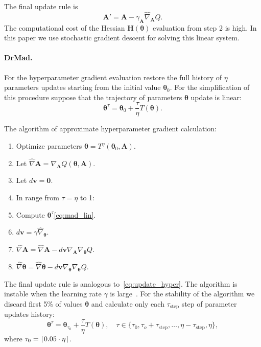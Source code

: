 \documentclass[12pt]{article}
\DeclarePairedDelimiter\ceil{\lceil}{\rceil}
\begin{document}
The final update rule is
\begin{equation}
\label{eq:update_hyper}
\mathbf{A}' = \mathbf{A} - \gamma_{\mathbf{A}} \hat{\nabla}_{\mathbf{A}}Q.
\end{equation}
The computational cost of the Hessian $\mathbf{H}(\boldsymbol{\theta})$ evaluation  from step 2 is high.  In this paper we use stochastic gradient descent for solving this linear system. 


\paragraph{DrMad.}
For the hyperparameter gradient evaluation restore the full history of $\eta$ parameters updates starting from the initial value $\boldsymbol{\theta}_0$.  For the simplification of this procedure suppose that the trajectory of parameters $\boldsymbol{\theta}$ update is linear:
\begin{equation}
\label{eq:mad_lin}
\boldsymbol{\theta}^\tau = \boldsymbol{\theta}_0 + \frac{\tau}{\eta} T(\boldsymbol{\theta}).
\end{equation}

The algorithm of approximate hyperparameter gradient calculation:
\begin{enumerate}
\item Optimize  parameters $\boldsymbol{\theta} = T^\eta(\boldsymbol{\theta}_0, \mathbf{A})$.
\item Let $\hat{\nabla} \mathbf{A} = \nabla_\mathbf{A} Q(\boldsymbol{\theta}, \mathbf{A}).$ 
\item Let $d\mathbf{v} = \mathbf{0}.$
\item In range from $\tau = \eta$ to  1:
\item Compute $\boldsymbol{\theta}^\tau$\eqref{eq:mad_lin}.
\item $d\mathbf{v} =  \gamma \hat{\nabla}_{\boldsymbol{\theta}}$.
\item $\hat{\nabla} \mathbf{A} =  \hat{\nabla} \mathbf{A} - d\mathbf{v}\nabla_{\mathbf{A}} \nabla_{\boldsymbol{\theta}} Q$.
\item $\hat{\nabla} \boldsymbol{\theta}  = \hat{\nabla} \boldsymbol{\theta}  - d\mathbf{v}\nabla_{\boldsymbol{\theta}} \nabla_{\boldsymbol{\theta}} Q$.
\end{enumerate}
The final update rule is analogous to~\eqref{eq:update_hyper}.
The algorithm is instable when the learning rate $\gamma$ is large~\cite{hyper_mad}. For the stability of the algorithm we discard first 5\% of values  $\boldsymbol{\theta}$ and calculate only each $\tau_\text{step}$ step of parameter updates history:
\begin{equation}
\label{eq:mad_lin2}
\boldsymbol{\theta}^\tau = \boldsymbol{\theta}_{\tau_0} + \frac{\tau}{\eta} T(\boldsymbol{\theta}), \quad \tau \in \{\tau_0, \tau_o + \tau_\text{step}, \dots,\eta - \tau_\text{step}, \eta\},
\end{equation}
where $\tau_0 = \ceil{0.05 \cdot \eta}$.
\end{document}

